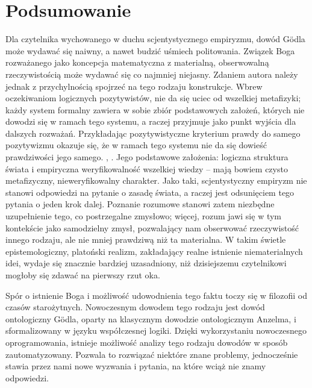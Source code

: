 \documentclass[runningheads]{llncs}
\begin{document}
\section{Podsumowanie} \label{sec:summary}
Dla czytelnika wychowanego w duchu scjentystycznego empiryzmu, dowód G\"odla może wydawać się naiwny, a nawet budzić uśmiech politowania. Związek Boga rozważanego jako koncepcja matematyczna z materialną, obserwowalną rzeczywistością może wydawać się co najmniej niejasny. Zdaniem autora należy jednak z przychylnością spojrzeć na tego rodzaju konstrukcje. Wbrew oczekiwaniom logicznych pozytywistów, nie da się uciec od wszelkiej metafizyki; każdy system formalny zawiera w sobie zbiór podstawowych założeń, których nie dowodzi się w ramach tego systemu, a raczej przyjmuje jako punkt wyjścia dla dalszych rozważań. Przykładając pozytywistyczne kryterium prawdy do samego pozytywizmu okazuje się, że w ramach tego systemu nie da się dowieść prawdziwości jego samego. \cite{putnam1985}, \cite{stanford2005}. Jego podstawowe założenia: logiczna struktura świata i empiryczna weryfikowalność wszelkiej wiedzy -- mają bowiem czysto metafizyczny, nieweryfikowalny charakter. Jako taki, scjentystyczny empiryzm nie stanowi odpowiedzi na pytanie o zasadę świata, a raczej jest odsunięciem tego pytania o jeden krok dalej. Poznanie rozumowe stanowi zatem niezbędne uzupełnienie tego, co postrzegalne zmysłowo; więcej, rozum jawi się w tym kontekście jako samodzielny zmysł, pozwalający nam obserwować rzeczywistość innego rodzaju, ale nie mniej prawdziwą niż ta materialna. W takim świetle epistemologiczny, platoński realizm, zakładający realne istnienie niematerialnych idei, wydaje się znacznie bardziej uzasadniony, niż dzisiejszemu czytelnikowi mogłoby się zdawać na pierwszy rzut oka. 

Spór o istnienie Boga i możliwość udowodnienia tego faktu toczy się w filozofii od czasów starożytnych. Nowoczesnym dowodem tego rodzaju jest dowód ontologiczny G\"odla, oparty na klasycznym dowodzie ontologicznym Anzelma, i sformalizowany w języku współczesnej logiki. Dzięki wykorzystaniu nowoczesnego oprogramowania, istnieje możliwość analizy tego rodzaju dowodów w sposób zautomatyzowany. Pozwala to rozwiązać niektóre znane problemy, jednocześnie stawia przez nami nowe wyzwania i pytania, na które wciąż nie znamy odpowiedzi. 




\end{document}
